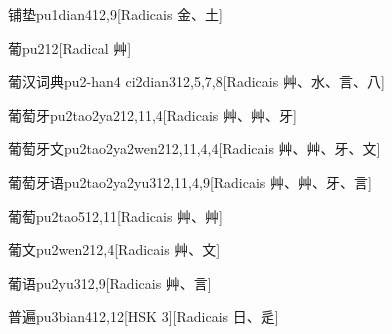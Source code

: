 \begin{entry}{铺垫}{pu1dian4}{12,9}[Radicais ⾦、⼟]
\end{entry}

\begin{entry}{葡}{pu2}{12}[Radical ⾋]
\end{entry}

\begin{entry}{葡汉词典}{pu2-han4 ci2dian3}{12,5,7,8}[Radicais ⾋、⽔、⾔、⼋]
\end{entry}

\begin{entry}{葡萄牙}{pu2tao2ya2}{12,11,4}[Radicais ⾋、⾋、⽛]
\end{entry}

\begin{entry}{葡萄牙文}{pu2tao2ya2wen2}{12,11,4,4}[Radicais ⾋、⾋、⽛、⽂]
\end{entry}

\begin{entry}{葡萄牙语}{pu2tao2ya2yu3}{12,11,4,9}[Radicais ⾋、⾋、⽛、⾔]
\end{entry}

\begin{entry}{葡萄}{pu2tao5}{12,11}[Radicais ⾋、⾋]
\end{entry}

\begin{entry}{葡文}{pu2wen2}{12,4}[Radicais ⾋、⽂]
\end{entry}

\begin{entry}{葡语}{pu2yu3}{12,9}[Radicais ⾋、⾔]
\end{entry}

\begin{entry}{普遍}{pu3bian4}{12,12}[HSK 3][Radicais ⽇、⾡]
\end{entry}

